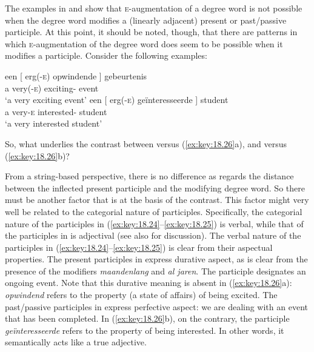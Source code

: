 \documentclass[output=paper]{langsci/langscibook}
\begin{document}
The examples in  and  show that
\textsc{e}-augmentation of a degree word is not possible when the degree word
modifies a (linearly adjacent) present or past/passive participle. At this
point, it should be noted, though, that there are patterns in which
\textsc{e}-augmentation of the degree word does seem to be possible when it
modifies a participle. Consider the following examples:

\ea%
    \label{ex:key:18.26}
	\ea
	\gll een [ erg(\textsc{-e})    opwindende ]    gebeurtenis\\
        a {} very(-\textsc{e})    exciting-\Agr{} {} event\\
	\glt \enquote*{a very exciting event}
	\ex
	\gll een [ erg(-\textsc{e})  geïnteresseerde ]    student\\
        a {}   very-\textsc{e}      interested-\Agr{} {}     student\\
	\glt \enquote*{a very interested student}
	\z
\z

So, what underlies the contrast between  versus
(\ref{ex:key:18.26}a), and  versus (\ref{ex:key:18.26}b)?

From a string-based perspective, there is no difference as regards the distance
between the inflected present participle and the modifying degree
word. So there must be another factor that is at the basis of
the contrast. This factor might very well be related to the categorial nature
of participles.  Specifically, the categorial nature of the participles in
(\ref{ex:key:18.24}--\ref{ex:key:18.25}) is verbal, while that of the
participles in  is adjectival (see also
\citealt{Broekhuis2013} for discussion). The verbal nature of the participles
in (\ref{ex:key:18.24}--\ref{ex:key:18.25}) is clear from their aspectual
properties.  The present participles in  express durative
aspect, as is clear from the presence of the modifiers \emph{maandenlang} and
\emph{al jaren}. The participle designates an ongoing event. Note that this
durative meaning is absent in (\ref{ex:key:18.26}a): \emph{opwindend} refers to
the property (a state of affairs) of being excited. The past/passive
participles in  express perfective aspect: we are dealing
with an event that has been completed. In (\ref{ex:key:18.26}b), on the
contrary, the participle \emph{geïnteresseerde} refers to the property of being
interested. In other words, it semantically acts like a true adjective.
\end{document}
